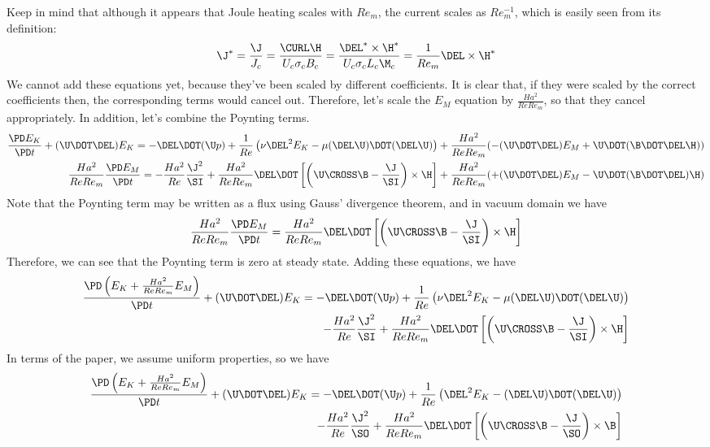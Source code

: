 \documentclass[11pt]{article}
\begin{document}
Keep in mind that although it appears that Joule heating scales with $Re_m$, the current scales as $Re_m^{-1}$, which is easily seen from its definition:
\begin{equation}
	\J^* = \frac{\J}{J_c} = \frac{\CURL \H}{U_c \sigma_c B_c} = \frac{\DEL^* \times \H^*}{U_c \sigma_c L_c \M_c} = \frac{1}{Re_m} \DEL \times \H^*
\end{equation}
We cannot add these equations yet, because they've been scaled by different coefficients. It is clear that, if they were scaled by the correct coefficients then, the corresponding terms would cancel out. Therefore, let's scale the $E_M$ equation by $\frac{Ha^2}{Re Re_m}$, so that they cancel appropriately. In addition, let's combine the Poynting terms.
\begin{equation}\begin{aligned}
	\frac{\PD E_K}{\PD t}
	+ (\U \DOT \DEL) E_K
	=
	- \DEL \DOT (\U p)
	+ \frac{1}{Re} \left( \nu \DEL^2 E_K -  \mu (\DEL \U) \DOT (\DEL \U) \right)
	+ \frac{Ha^2}{Re Re_m} (  - (\U \DOT \DEL) E_M + \U \DOT (\B \DOT \DEL \H) )
	\\
	\frac{Ha^2}{Re Re_m} \frac{\PD E_M}{\PD t} =
	- \frac{Ha^2}{Re} \frac{\J^2}{\SI}
	+ \frac{Ha^2}{Re Re_m} \DEL \DOT \left[\left(\U \CROSS \B - \frac{\J}{\SI} \right) \times \H \right]
	+ \frac{Ha^2}{Re Re_m} ( + (\U \DOT \DEL) E_M - \U \DOT (\B \DOT \DEL) \H )
\end{aligned}\end{equation}
Note that the Poynting term may be written as a flux using Gauss' divergence theorem, and in vacuum domain we have
\begin{equation}\begin{aligned}
	\frac{Ha^2}{Re Re_m} \frac{\PD E_M}{\PD t} =
	\frac{Ha^2}{Re Re_m} \DEL \DOT \left[\left(\U \CROSS \B - \frac{\J}{\SI} \right) \times \H \right]
\end{aligned}\end{equation}
Therefore, we can see that the Poynting term is zero at steady state. Adding these equations, we have
\begin{equation}\begin{aligned}
	\frac{\PD \left( E_K + \frac{Ha^2}{Re Re_m} E_M \right)}{\PD t}
	+ (\U \DOT \DEL) E_K
	=
	- \DEL \DOT (\U p)
	+ \frac{1}{Re} \left( \nu \DEL^2 E_K -  \mu (\DEL \U) \DOT (\DEL \U) \right) \\
	- \frac{Ha^2}{Re} \frac{\J^2}{\SI}
	+ \frac{Ha^2}{Re Re_m} \DEL \DOT \left[\left(\U \CROSS \B - \frac{\J}{\SI} \right) \times \H \right]
\end{aligned}\end{equation}
In terms of the paper, we assume uniform properties, so we have
\begin{equation}\begin{aligned}
	\frac{\PD \left( E_K + \frac{Ha^2}{Re Re_m} E_M \right)}{\PD t}
	+ (\U \DOT \DEL) E_K
	=
	- \DEL \DOT (\U p)
	+ \frac{1}{Re} \left( \DEL^2 E_K - (\DEL \U) \DOT (\DEL \U) \right) \\
	- \frac{Ha^2}{Re} \frac{\J^2}{\SO}
	+ \frac{Ha^2}{Re Re_m} \DEL \DOT \left[\left(\U \CROSS \B - \frac{\J}{\SO} \right) \times \B \right]
\end{aligned}\end{equation}
\end{document}
